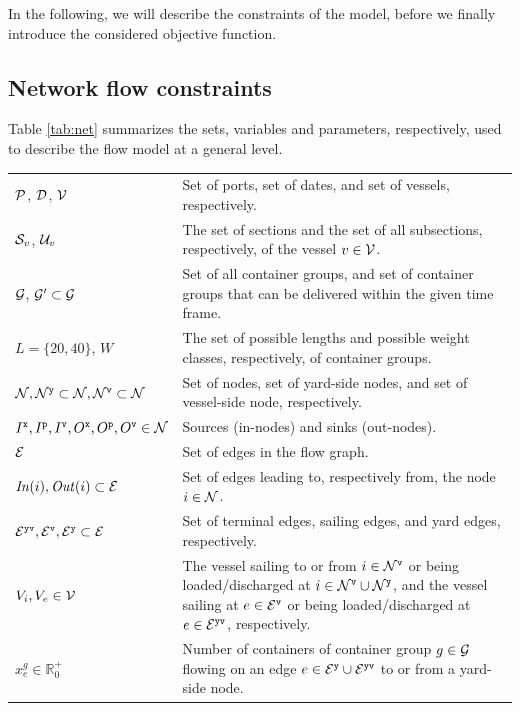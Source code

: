 In the following, we will describe the constraints of the model, before we finally introduce the considered objective function.
\subsection{Network flow constraints}\label{sec:flow}
 Table \ref{tab:net} summarizes the sets, variables and parameters, respectively, used to describe the flow model at a general level.

\begin{table}
\centering
\btsize
\begin{tabular}{lp{10cm}}
$\mathcal{P}$, $\mathcal{D}$, $\mathcal{V}$	& Set of ports, set of dates, and set of vessels, respectively.\\
$\mathcal{S}_v$, $\mathcal{U}_v$				& The set of sections and the set of all subsections, respectively, of the vessel $v\in\mathcal{V}$.\\ 
$\mathcal{G}$, $\mathcal{G}'\subset \mathcal{G}$
															& Set of all container groups, and set of container groups that can be delivered within the given time frame.\\
$L=\{20,40\}$, $W$						& The set of possible lengths and possible weight classes, respectively, of container groups.\\
$\mathcal{N}, \mathcal{N}^\texttt{y}\subset \mathcal{N}, \mathcal{N}^\texttt{v}\subset \mathcal{N}$
															& Set of nodes, set of yard-side nodes, and set of vessel-side node, respectively. \\
$I^\texttt{x},I^\texttt{p},I^\texttt{v}, O^\texttt{x}, O^\texttt{p},O^\texttt{v}\in\mathcal{N}$
															& Sources (in-nodes) and sinks (out-nodes). \\
$\mathcal{E}$									 		& Set of edges in the flow graph.\\
$\mathit{In}(i),\mathit{Out}(i)\subset \mathcal{E}$	
															& Set of edges leading to, respectively from, the node $i\in\mathcal{N}$.\\
$\mathcal{E}^\texttt{yv}, \mathcal{E}^\texttt{v}, \mathcal{E}^\texttt{y}\subset\mathcal{E}$
															& Set of terminal edges, sailing edges, and yard edges, respectively.\\
$V_i, V_e\in\mathcal{V}$						& The vessel sailing to or from $i\in \mathcal{N}^\texttt{v}$ or being loaded/discharged at $i\in\mathcal{N}^\texttt{v}\cup\mathcal{N}^\texttt{y}$, and the vessel sailing at $e\in\mathcal{E}^\texttt{v}$ or being loaded/discharged at $e\in\mathcal{E}^\texttt{yv}$, respectively.\\ 
\hline
$x^g_e\in\mathbb{R}^+_0$			& Number of containers of container group $g\in \mathcal{G}$ flowing on an edge $e\in \mathcal{E}^\texttt{y}\cup\mathcal{E}^\texttt{yv}$ to or from a yard-side node.\\

\end{tabular}
\end{table}
